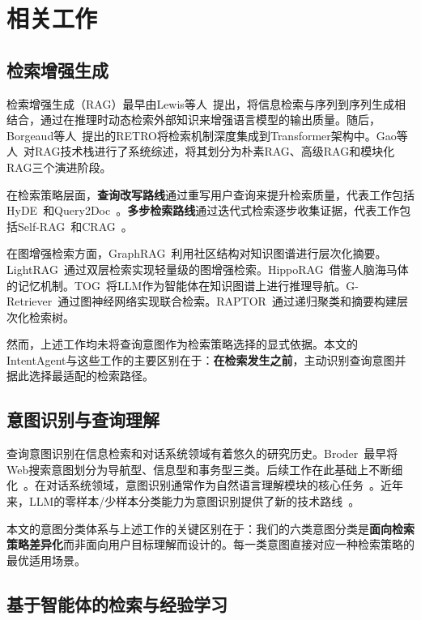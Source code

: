 \documentclass[runningheads]{llncs}
\begin{document}
\section{相关工作}

\subsection{检索增强生成}

检索增强生成（RAG）最早由Lewis等人~\cite{ref1}提出，将信息检索与序列到序列生成相结合，通过在推理时动态检索外部知识来增强语言模型的输出质量。随后，Borgeaud等人~\cite{ref3}提出的RETRO将检索机制深度集成到Transformer架构中。Gao等人~\cite{ref2}对RAG技术栈进行了系统综述，将其划分为朴素RAG、高级RAG和模块化RAG三个演进阶段。

在检索策略层面，\textbf{查询改写路线}通过重写用户查询来提升检索质量，代表工作包括HyDE~\cite{ref4}和Query2Doc~\cite{ref5}。\textbf{多步检索路线}通过迭代式检索逐步收集证据，代表工作包括Self-RAG~\cite{ref6}和CRAG~\cite{ref7}。

在图增强检索方面，GraphRAG~\cite{ref27}利用社区结构对知识图谱进行层次化摘要。LightRAG~\cite{ref26}通过双层检索实现轻量级的图增强检索。HippoRAG~\cite{ref28}借鉴人脑海马体的记忆机制。TOG~\cite{ref24}将LLM作为智能体在知识图谱上进行推理导航。G-Retriever~\cite{ref25}通过图神经网络实现联合检索。RAPTOR~\cite{ref23}通过递归聚类和摘要构建层次化检索树。

然而，上述工作均未将查询意图作为检索策略选择的显式依据。本文的IntentAgent与这些工作的主要区别在于：\textbf{在检索发生之前}，主动识别查询意图并据此选择最适配的检索路径。

\subsection{意图识别与查询理解}

查询意图识别在信息检索和对话系统领域有着悠久的研究历史。Broder~\cite{ref8}最早将Web搜索意图划分为导航型、信息型和事务型三类。后续工作在此基础上不断细化~\cite{ref9,ref10}。在对话系统领域，意图识别通常作为自然语言理解模块的核心任务~\cite{ref11}。近年来，LLM的零样本/少样本分类能力为意图识别提供了新的技术路线~\cite{ref12}。

本文的意图分类体系与上述工作的关键区别在于：我们的六类意图分类是\textbf{面向检索策略差异化}而非面向用户目标理解而设计的。每一类意图直接对应一种检索策略的最优适用场景。

\subsection{基于智能体的检索与经验学习}
\end{document}
